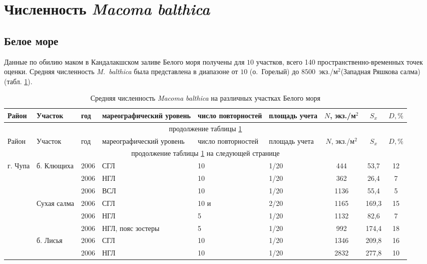 
	\section{Численность {\it Macoma balthica}}
	\subsection{Белое море}
Данные по обилию маком в Кандалакшском заливе Белого моря получены для $10$ участков, всего 140 пространственно-временных точек оценки.
Средняя численность {\it M.~balthica} была представлена в диапазоне от $10$ (о.~Горелый) до $8500$~экз./м$^2$(Западная Ряшкова салма) (табл. \ref{tab:mean_N_White}).
	\begin{footnotesize}
	\begin{longtable}{|p{2cm}|p{3cm}|p{1cm}|p{2cm}|p{1.5cm}|p{1cm}|*{3}{c|}}
	\caption{Средняя численность {\it Macoma balthica} на различных участках Белого моря}\label{tab:mean_N_White}\\
	\hline
	Район & Участок & год & ма\-ре\-ографи\-ческий уровень & число повторностей & площадь учета & $N$, экз./м$^2$ & $S_x$  & $D, \%$ 
	\\ \hline \endfirsthead
	\hline
	\multicolumn{9}{|c|}{продолжение таблицы \ref{tab:mean_N_White}} \\ \hline
	Район & Участок & год & ма\-ре\-ографи\-ческий уровень & число повторностей & площадь учета & $N$, экз./м$^2$ & $S_x$  & $D, \%$ 
	\\ \hline \endhead
	\hline 
	\multicolumn{9}{|c|}{продолжение таблицы \ref{tab:mean_N_White} на следующей странице}
	\\ \hline \endfoot
	 \endlastfoot
	г. Чупа & б. Клющиха & 2006 & СГЛ & 10 & 1/20 & 444 & 53,7 & 12
		\\ \cline{3-9}
		 &  & 2006 & НГЛ & 10 & 1/20 & 362 & 26,4 & 7
		\\ \cline{3-9}
		 &  & 2006 & ВСЛ & 10 & 1/20 & 1136 & 55,4 & 5
		\\ \cline{2-9}
		 & Сухая салма & 2006 & СГЛ & 10 и & 2/20 & 1165 & 169,3 & 15
		\\ \cline{3-9}
		 &  & 2006 & НГЛ & 5 & 1/20 & 1132 & 82,6 & 7
		\\ \cline{3-9}
		 &  & 2006 & НГЛ, пояс зостеры & 5 & 1/20 & 992 & 174,4 & 18
		\\ \cline{2-9}
		 & б. Лисья & 2006 & СГЛ & 10 & 1/20 & 1346 & 209,8 & 16
		\\ \cline{3-9}
		 &  & 2006 & НГЛ & 10 & 1/20 & 2832 & 277,8 & 10
		\\ \cline{3-9}

\end{longtable}
\end{footnotesize}

